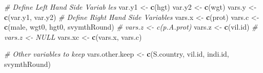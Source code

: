 \documentclass[
]{book}
\newenvironment{Shaded}{\begin{snugshade}}{\end{snugshade}}
\newcommand{\CommentTok}[1]{\textcolor[rgb]{0.56,0.35,0.01}{\textit{#1}}}
\newcommand{\KeywordTok}[1]{\textcolor[rgb]{0.13,0.29,0.53}{\textbf{#1}}}
\newcommand{\NormalTok}[1]{#1}
\newcommand{\StringTok}[1]{\textcolor[rgb]{0.31,0.60,0.02}{#1}}
\begin{document}
\begin{Shaded}
\begin{Highlighting}[]
\CommentTok{\# Define Left Hand Side Variab les}
\NormalTok{var.y1 \textless{}{-}}\StringTok{ }\KeywordTok{c}\NormalTok{(}\StringTok{\textquotesingle{}hgt\textquotesingle{}}\NormalTok{)}
\NormalTok{var.y2 \textless{}{-}}\StringTok{ }\KeywordTok{c}\NormalTok{(}\StringTok{\textquotesingle{}wgt\textquotesingle{}}\NormalTok{)}
\NormalTok{vars.y \textless{}{-}}\StringTok{ }\KeywordTok{c}\NormalTok{(var.y1, var.y2)}
\CommentTok{\# Define Right Hand Side Variables}
\NormalTok{vars.x \textless{}{-}}\StringTok{ }\KeywordTok{c}\NormalTok{(}\StringTok{\textquotesingle{}prot\textquotesingle{}}\NormalTok{)}
\NormalTok{vars.c \textless{}{-}}\StringTok{ }\KeywordTok{c}\NormalTok{(}\StringTok{\textquotesingle{}male\textquotesingle{}}\NormalTok{, }\StringTok{\textquotesingle{}wgt0\textquotesingle{}}\NormalTok{, }\StringTok{\textquotesingle{}hgt0\textquotesingle{}}\NormalTok{, }\StringTok{\textquotesingle{}svymthRound\textquotesingle{}}\NormalTok{)}
\CommentTok{\# vars.z \textless{}{-} c(\textquotesingle{}p.A.prot\textquotesingle{})}
\NormalTok{vars.z \textless{}{-}}\StringTok{ }\KeywordTok{c}\NormalTok{(}\StringTok{\textquotesingle{}vil.id\textquotesingle{}}\NormalTok{)}
\CommentTok{\# vars.z \textless{}{-} NULL}
\NormalTok{vars.xc \textless{}{-}}\StringTok{ }\KeywordTok{c}\NormalTok{(vars.x, vars.c)}

\CommentTok{\# Other variables to keep}
\NormalTok{vars.other.keep \textless{}{-}}\StringTok{ }\KeywordTok{c}\NormalTok{(}\StringTok{\textquotesingle{}S.country\textquotesingle{}}\NormalTok{, }\StringTok{\textquotesingle{}vil.id\textquotesingle{}}\NormalTok{, }\StringTok{\textquotesingle{}indi.id\textquotesingle{}}\NormalTok{, }\StringTok{\textquotesingle{}svymthRound\textquotesingle{}}\NormalTok{)}


\end{Highlighting}
\end{Shaded}
\end{document}
